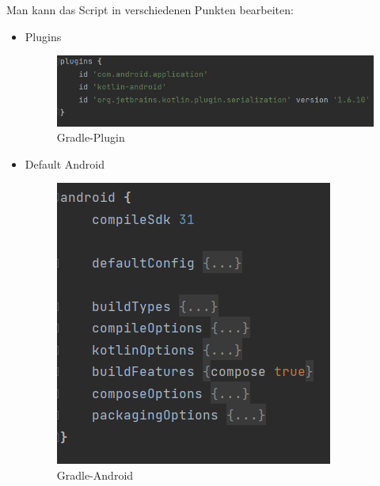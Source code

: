 Man kann das Script in verschiedenen Punkten bearbeiten:
\begin{itemize}
    \item Plugins
    \begin{figure}[htp]
        \author{Bozidar Spasenovic}
        \centering
        \includegraphics[scale=0.60]{pics/gradle-plugins.PNG}
        \caption{Gradle-Plugin}
        \label{fig:impl:gradle-plugin}
    \end{figure}   
    \linebreak
    \item Default Android
    \begin{figure}[htp]
        \author{Bozidar Spasenovic}
        \centering
        \includegraphics[scale=0.60]{pics/gradle-android.PNG}
        \caption{Gradle-Android}
        \label{fig:impl:gradle-android}
    \end{figure}   
    \linebreak


\end{itemize}
